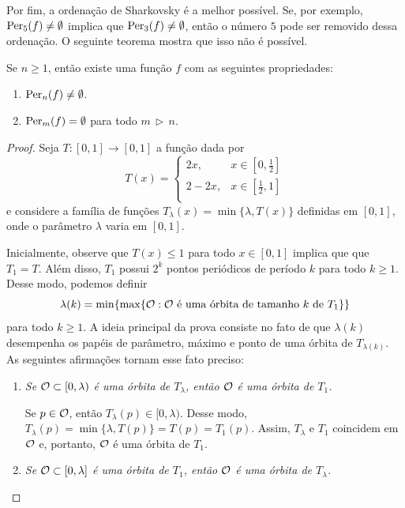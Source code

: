 Por fim, a ordenação de Sharkovsky é a melhor possível. Se, por exemplo, $\operatorname{Per}_5(f) \neq \emptyset$ implica que $\operatorname{Per}_3(f) \neq \emptyset$, então o número $5$ pode ser removido dessa ordenação. O seguinte teorema mostra que isso não é possível.

\begin{theorem}
Se $n \geq 1$, então existe uma função $f$ com as seguintes propriedades:
\begin{enumerate}
\item $\operatorname{Per}_n(f) \neq \emptyset$.
\item $\operatorname{Per}_m(f) =  \emptyset$ para todo $m \, \triangleright \, n$.
\end{enumerate}
\end{theorem}

\begin{proof}
Seja $T: [0,1] \to [0,1]$ a função dada por
\[ T(x) =
  \begin{cases}
    2x, & x \in \left[ 0, \frac{1}{2} \right] \\
    2 - 2x, & x \in \left[ \frac{1}{2}, 1 \right] \\
  \end{cases}
\]
e considere a família de funções $T_\lambda(x) = \min \lbrace \lambda, T(x) \rbrace$ definidas em $[0,1]$, onde o parâmetro $\lambda$ varia em $[0,1]$.

Inicialmente, observe que $T(x) \leq 1$ para todo $x \in [0,1]$ implica que que $T_1 = T$.
Além disso, $T_1$ possui $2^k$ pontos periódicos de período $k$ para todo $k \geq 1$.
Desse modo, podemos definir
$$\lambda(k) = \min \lbrace \max \lbrace \mathcal{O} : \mathcal{O} \text{ é uma órbita de tamanho } k \text{ de } T_1 \rbrace \rbrace$$
para todo $k \geq 1$.
A ideia principal da prova consiste no fato de que $\lambda(k)$ desempenha os papéis de parâmetro, máximo e ponto de uma órbita de $T_{\lambda(k)}$. As seguintes afirmações tornam esse fato preciso:

\begin{enumerate}[label=\alph*)]
\item \textit{Se $\mathcal{O} \subset [0, \lambda)$ é uma órbita de $T_\lambda$, então $\mathcal{O}$ é uma órbita de $T_1$.}

Se $p \in \mathcal{O}$, então $T_\lambda(p) \in [0, \lambda)$.
Desse modo, $T_\lambda(p) = \min \lbrace \lambda, T(p) \rbrace = T(p) = T_1(p)$.
Assim, $T_\lambda$ e $T_1$ coincidem em $\mathcal{O}$ e, portanto, $\mathcal{O}$ é uma órbita de $T_1$.

\item \textit{Se $\mathcal{O} \subset [0, \lambda]$ é uma órbita de $T_1$, então $\mathcal{O}$ é uma órbita de $T_\lambda$.}


\end{enumerate}
\end{proof}
